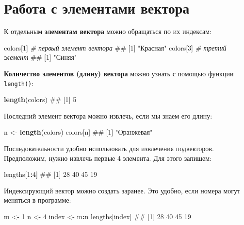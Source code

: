 \documentclass[]{book}
\newenvironment{Shaded}{\begin{snugshade}}{\end{snugshade}}
\newcommand{\KeywordTok}[1]{\textcolor[rgb]{0.13,0.29,0.53}{\textbf{#1}}}
\newcommand{\DecValTok}[1]{\textcolor[rgb]{0.00,0.00,0.81}{#1}}
\newcommand{\StringTok}[1]{\textcolor[rgb]{0.31,0.60,0.02}{#1}}
\newcommand{\CommentTok}[1]{\textcolor[rgb]{0.56,0.35,0.01}{\textit{#1}}}
\newcommand{\OperatorTok}[1]{\textcolor[rgb]{0.81,0.36,0.00}{\textbf{#1}}}
\newcommand{\NormalTok}[1]{#1}
\begin{document}
\section{Работа с элементами вектора}\label{vector_elements}

К отдельным \textbf{элементам вектора} можно обращаться по их индексам:

\begin{Shaded}
\begin{Highlighting}[]
\NormalTok{colors[}\DecValTok{1}\NormalTok{] }\CommentTok{# первый элемент вектора}
\NormalTok{## [1] "Красная"}
\NormalTok{colors[}\DecValTok{3}\NormalTok{] }\CommentTok{# третий элемент}
\NormalTok{## [1] "Синяя"}
\end{Highlighting}
\end{Shaded}

\textbf{Количество элементов (длину) вектора} можно узнать с помощью
функции \texttt{length()}:

\begin{Shaded}
\begin{Highlighting}[]
\KeywordTok{length}\NormalTok{(colors)}
\NormalTok{## [1] 5}
\end{Highlighting}
\end{Shaded}

Последний элемент вектора можно извлечь, если мы знаем его длину:

\begin{Shaded}
\begin{Highlighting}[]
\NormalTok{n <-}\StringTok{ }\KeywordTok{length}\NormalTok{(colors)}
\NormalTok{colors[n]}
\NormalTok{## [1] "Оранжевая"}
\end{Highlighting}
\end{Shaded}

Последовательности удобно использовать для извлечения подвекторов.
Предположим, нужно извлечь первые 4 элемента. Для этого запишем:

\begin{Shaded}
\begin{Highlighting}[]
\NormalTok{lengths[}\DecValTok{1}\OperatorTok{:}\DecValTok{4}\NormalTok{]}
\NormalTok{## [1] 28 40 45 19}
\end{Highlighting}
\end{Shaded}

Индексирующий вектор можно создать заранее. Это удобно, если номера
могут меняться в программе:

\begin{Shaded}
\begin{Highlighting}[]
\NormalTok{m <-}\StringTok{ }\DecValTok{1}
\NormalTok{n <-}\StringTok{ }\DecValTok{4}
\NormalTok{index <-}\StringTok{ }\NormalTok{m}\OperatorTok{:}\NormalTok{n}
\NormalTok{lengths[index]}
\NormalTok{## [1] 28 40 45 19}
\end{Highlighting}
\end{Shaded}
\end{document}
